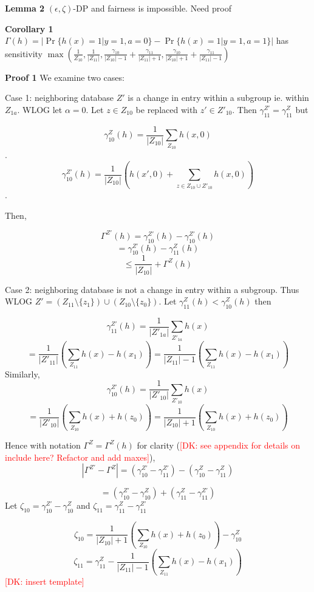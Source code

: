 \documentclass[format = sigconf]{acmart}
\newcommand{\dk}[1]{\textcolor{red}{[DK: #1]}}
\newcommand{\1}{\mathbbm{1}}
\newcommand{\eps}{\epsilon}
\newcommand{\zt}{\zeta}
\newcommand{\gz}[1]{\gamma_{#1}^Z(h)}
\newcommand{\z}[1]{Z_{#1}}
\theoremstyle{definition}
\begin{document}
{\bf Lemma 2} $(\eps, \zt)$-DP and fairness is impossible. Need proof




{\bf Corollary 1} $\Gamma(h) = |\Pr\{h(x) = 1 | y=1, a =0\} - \Pr\{h(x) = 1 | y = 1, a = 1\}|$ has sensitivity $\max(\frac{1}{\z{10}},\frac{1}{|Z_{11}|}, \frac{\gamma_{10}}{|\z{10}|-1} + \frac{\gamma_{11}}{|Z_{11}|+1}, \frac{\gamma_{10}}{|\z{10}|+1} + \frac{\gamma_{11}}{|Z_{11}|-1})$

{\bf Proof 1}
We examine two cases:

Case 1: neighboring database $Z'$ is a change in entry within a subgroup ie. within $Z_{1a}$. WLOG let $\alpha = 0$. Let $z \in \z{10}$ be replaced with $z' \in Z'_{10}$. Then $\gamma^{Z'}_{11} = \gamma^Z_{11}$ but

$$\gamma_{10}^Z(h) = \frac{1}{|\z{10}|} \sum_{\z{10}} h(x,0)$$.
$$\gamma_{10}^{Z'}(h) = \frac{1}{|\z{10}|} (h(x', 0) +\sum_{z \in \z{10} \cup Z'_{10}} h(x, 0))$$.

Then,

$$ \Gamma^{Z'}(h) = \gamma_{10}^{Z'}(h) - \gamma_{10}^{Z'}(h) $$
$$ = \gamma_{10}^{Z'}(h) - \gz{11} $$
$$ \leq \frac{1}{|\z{10}|}  + \Gamma^{Z}(h) $$


Case 2: neighboring database is not a change in entry within a subgroup. Thus WLOG $Z' =(Z_{11}\setminus \{z_1\} )\cup( \z{10}\setminus \{z_0\})$. Let $\gamma_{11}^{Z}(h) <\gamma_{10}^{Z}(h)$ then

$$\gamma_{11}^{Z'}(h) = \frac{1}{|Z'_{1a}|} \sum_{Z'_{1a}} h(x)$$
$$= \frac{1}{|Z'_{11}|} (\sum_{Z_{11}} h(x)-h(x_1)) = \frac{1}{|Z_{11}|-1} (\sum_{Z_{11}} h(x)-h(x_1))$$
Similarly,
$$\gamma_{10}^{Z'}(h) = \frac{1}{|Z'_{10}|} \sum_{Z'_{10}} h(x)$$
$$ = \frac{1}{|Z'_{10}|} (\sum_{\z{10}} h(x)+h(z_0))= \frac{1}{|\z{10}|+1} (\sum_{\z{10}} h(x)+h(z_0))$$

Hence with notation $ \Gamma^Z = \Gamma^Z(h)$ for clarity (\dk{see appendix for details on include here? Refactor and add maxes}), $$|\Gamma^{Z'}- \Gamma^{Z}| = (\gamma_{10}^{Z'} - \gamma_{11}^{Z'}) - (\gamma_{10}^{Z} - \gamma_{11}^{Z})$$


$$=(\gamma_{10}^{Z'}- \gamma_{10}^{Z}) + (\gamma_{11}^{Z} -\gamma_{11}^{Z'})$$
Let $\zt_{10}= \gamma_{10}^{Z'}- \gamma_{10}^{Z}$ and  $\zt_{11} = \gamma_{11}^{Z} -\gamma_{11}^{Z'}$

$$\zt_{10} = \frac{1}{|\z{10}|+1} (\sum_{\z{10}} h(x)+h(z_0)) - \gamma_{10}^{Z}$$
$$\zt_{11} = \gamma_{11}^{Z}- \frac{1}{|Z_{11}|-1} (\sum_{Z_{11}} h(x)-h(x_1))$$
\dk {insert template}
\end{document}
